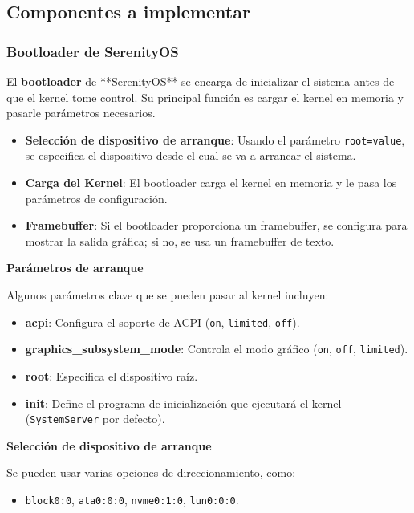 \subsection{Componentes a implementar}

\subsubsection{Bootloader de SerenityOS}

El \textbf{bootloader} de **SerenityOS** se encarga de inicializar el sistema antes de que el kernel tome control. Su principal función es cargar el kernel en memoria y pasarle parámetros necesarios.

\begin{itemize}
  \item \textbf{Selección de dispositivo de arranque}: Usando el parámetro \texttt{root={value}}, se especifica el dispositivo desde el cual se va a arrancar el sistema.
  \item \textbf{Carga del Kernel}: El bootloader carga el kernel en memoria y le pasa los parámetros de configuración.
  \item \textbf{Framebuffer}: Si el bootloader proporciona un framebuffer, se configura para mostrar la salida gráfica; si no, se usa un framebuffer de texto.
\end{itemize}

\textbf{Parámetros de arranque}

Algunos parámetros clave que se pueden pasar al kernel incluyen:
\begin{itemize}
  \item \textbf{acpi}: Configura el soporte de ACPI (\texttt{on}, \texttt{limited}, \texttt{off}).
  \item \textbf{graphics\_subsystem\_mode}: Controla el modo gráfico (\texttt{on}, \texttt{off}, \texttt{limited}).
  \item \textbf{root}: Especifica el dispositivo raíz.
  \item \textbf{init}: Define el programa de inicialización que ejecutará el kernel (\texttt{SystemServer} por defecto).
\end{itemize}

\textbf{Selección de dispositivo de arranque}

Se pueden usar varias opciones de direccionamiento, como:
\begin{itemize}
  \item \texttt{block0:0}, \texttt{ata0:0:0}, \texttt{nvme0:1:0}, \texttt{lun0:0:0}.
\end{itemize}

